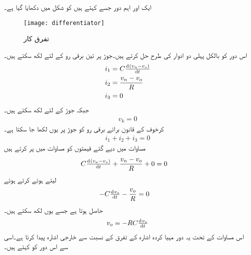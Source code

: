 ایک اور اہم دور جسے   کہتے ہیں کو شکل  میں دکھایا گیا ہے۔
\begin{figure}
\centering
\texttt{[image: differentiator]}
\caption{تفرق کار}
\label{شکل_تفرق_کار}
\end{figure}
	اس دور کو بالکل پہلی دو ادوار کی طرح حل کرتے ہیں۔جوڑ پر تین برقی رو کے لئے لکھ سکتے ہیں۔
\begin{align} \label{مساوات_تفرق_کار_کے_مساوات_کا_حصول}
i_1 &= C \od{\left (v_n-v_s \right )}{t} \nonumber \\
i_2 &=\frac{v_n-v_o}{R} \nonumber \\
i_3 &=0
\end{align}
جبکہ جوڑ  کے لئے لکھ سکتے ہیں۔
\begin{align}
v_k=0
\end{align}
کرخوف کے قانون برائے برقی رو کو جوڑ  پر یوں لکھا جا سکتا ہے۔
\begin{align} \label{مساوات_تفرق_کار_داخلی_جوڑ_پر_رو}
i_1+i_2+i_3=0
\end{align}
مساوات  میں دیے گئے قیمتوں کو مساوات   میں پر کرتے ہیں
\begin{align*}
C \od{\left(v_n-v_s\right)}{t}+\frac{v_n-v_o}{R}+0&=0
\end{align*}
 لیتے ہوئے   کرتے ہوئے
\begin{align*}
 -C \od{v_s}{t}-\frac{v_o}{R}&=0
\end{align*}
حاصل ہوتا ہے جسے یوں لکھ سکتے ہیں۔
\begin{align}
v_o = -RC \od{v_s}{t}
\end{align}
اس مساوات کے تحت یہ دور مہیا کردہ اشارہ  کے تفرق کے نسبت سے خارجی اشارہ  پیدا کرتا ہے۔اسی سے اس دور کو   کہتے ہیں۔



